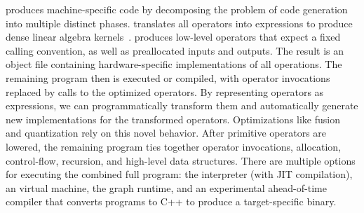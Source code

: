 \relay produces machine-specific code
  by decomposing the problem of code generation into multiple distinct phases.
\relay translates all operators into \tvm expressions
  to produce dense linear algebra kernels~\cite{tvm_osdi18, tensor_comprehensions, halide}.
\tvm produces low-level operators that expect a fixed calling convention,
  as well as preallocated inputs and outputs.
The result is an object file containing hardware-specific implementations of all
  operations.
The remaining \relay program then is executed or compiled,
  with operator invocations replaced by calls to the optimized operators.
By representing operators as \tvm expressions, we can programmatically
  transform them and automatically generate new implementations for the transformed operators.
Optimizations like fusion and quantization
  rely on this novel behavior.
After primitive operators are lowered,
  the remaining \relay program ties
  together operator invocations, allocation, control-flow,
  recursion, and high-level data structures.
There are multiple options for executing the combined full program:
  the \relay interpreter (with JIT compilation),
  an \relay virtual machine,
  the \tvm graph runtime,
  and an experimental \relay ahead-of-time compiler
  that converts programs to C++ to produce a target-specific binary.
